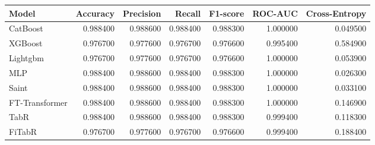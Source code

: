 \begin{tabular}{lrrrrrr}
\toprule
Model & Accuracy & Precision & Recall & F1-score & ROC-AUC & Cross-Entropy \\
\midrule
CatBoost & 0.988400 & 0.988600 & 0.988400 & 0.988300 & 1.000000 & 0.049500 \\
XGBoost & 0.976700 & 0.977600 & 0.976700 & 0.976600 & 0.995400 & 0.584900 \\
Lightgbm & 0.976700 & 0.977600 & 0.976700 & 0.976600 & 1.000000 & 0.053900 \\
MLP & 0.988400 & 0.988600 & 0.988400 & 0.988300 & 1.000000 & 0.026300 \\
Saint & 0.988400 & 0.988600 & 0.988400 & 0.988300 & 1.000000 & 0.033100 \\
FT-Transformer & 0.988400 & 0.988600 & 0.988400 & 0.988300 & 1.000000 & 0.146900 \\
TabR & 0.988400 & 0.988600 & 0.988400 & 0.988300 & 0.999400 & 0.118300 \\
FiTabR & 0.976700 & 0.977600 & 0.976700 & 0.976600 & 0.999400 & 0.188400 \\
\bottomrule
\end{tabular}
